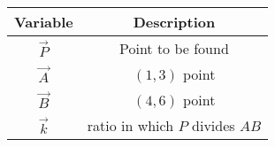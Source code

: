 \begin{tabular}[12pt]{ |c| c|}
    \hline
    \textbf{Variable} & \textbf{Description}\\ 
    \hline
	$\vec{P}$ & Point to be found\\
    \hline
	$\vec{A}$ & $(1,3)$ point\\
    \hline
	$\vec{B}$ & $(4,6)$ point\\
    \hline
	$\vec{k}$ & ratio in which $P$ divides $AB$\\
    \hline
    \end{tabular}
